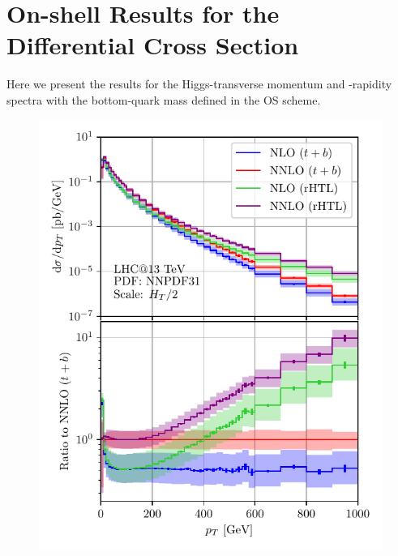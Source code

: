 

\chapter{On-shell Results for the Differential Cross Section}\label{app:4}

Here we present the results for the Higgs-transverse momentum and -rapidity spectra with the bottom-quark mass defined in the \acs{OS} scheme.
\begin{figure}[ht]
\begin{minipage}[t]{0.49\textwidth}
  \includegraphics[width=\textwidth]{Images/pT_13000_bOS_tOS.pdf}
\end{minipage}
\begin{minipage}[t]{0.49\textwidth}

\end{minipage}
\end{figure}
